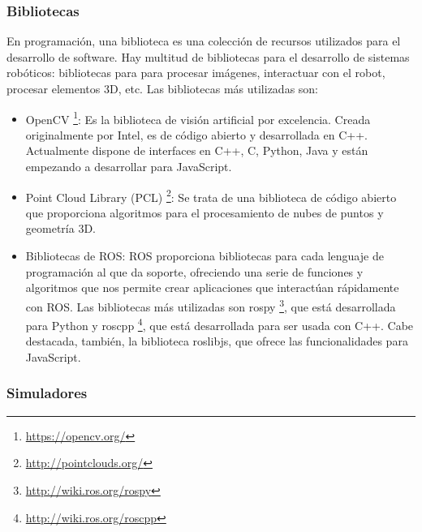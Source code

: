 \subsubsection{Bibliotecas}

En programación, una biblioteca es una colección de recursos utilizados para el desarrollo de software. Hay multitud de bibliotecas para el desarrollo de sistemas robóticos: bibliotecas para para procesar imágenes, interactuar con el robot, procesar elementos 3D, etc. Las bibliotecas más utilizadas son:
\begin{itemize}
	\item OpenCV \footnote{\url{https://opencv.org/}}: Es la biblioteca de visión artificial por excelencia. Creada originalmente por Intel, es de código abierto y desarrollada en C++. Actualmente dispone de interfaces en C++, C, Python, Java y están empezando a desarrollar para JavaScript.
	\item Point Cloud Library (PCL) \footnote{\url{http://pointclouds.org/}}: Se trata de una biblioteca de código abierto que proporciona algoritmos para el procesamiento de nubes de puntos y geometría 3D.
	\item Bibliotecas de ROS: ROS proporciona bibliotecas para cada lenguaje de programación al que da soporte, ofreciendo una serie de funciones y algoritmos que nos permite crear aplicaciones que interactúan rápidamente con ROS. Las bibliotecas más utilizadas son rospy \footnote{\url{http://wiki.ros.org/rospy}}, que está desarrollada para Python y roscpp \footnote{\url{http://wiki.ros.org/roscpp}}, que está desarrollada para ser usada con C++. Cabe destacada, también, la biblioteca roslibjs, que ofrece las funcionalidades para JavaScript.
\end{itemize}

\subsubsection{Simuladores}

